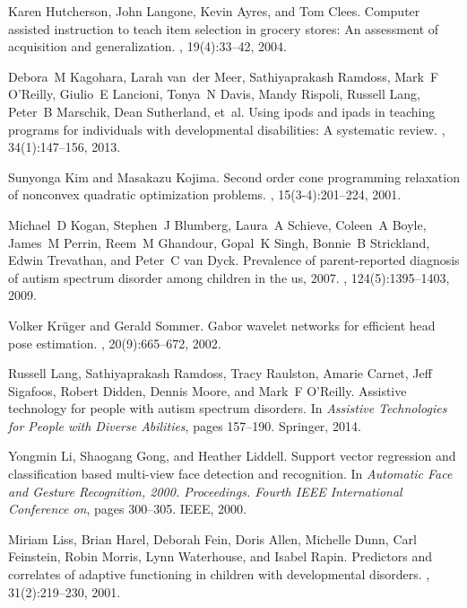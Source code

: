 \documentclass{ut-thesis}
\begin{document}
\begin{thebibliography}{100}
Karen Hutcherson, John Langone, Kevin Ayres, and Tom Clees.
\newblock Computer assisted instruction to teach item selection in grocery
  stores: An assessment of acquisition and generalization.
, 19(4):33--42, 2004.

Debora~M Kagohara, Larah van~der Meer, Sathiyaprakash Ramdoss, Mark~F
  O’Reilly, Giulio~E Lancioni, Tonya~N Davis, Mandy Rispoli, Russell Lang,
  Peter~B Marschik, Dean Sutherland, et~al.
\newblock Using ipods{\textregistered} and ipads{\textregistered} in teaching
  programs for individuals with developmental disabilities: A systematic
  review.
, 34(1):147--156, 2013.

Sunyonga Kim and Masakazu Kojima.
\newblock Second order cone programming relaxation of nonconvex quadratic
  optimization problems.
, 15(3-4):201--224, 2001.

Michael~D Kogan, Stephen~J Blumberg, Laura~A Schieve, Coleen~A Boyle, James~M
  Perrin, Reem~M Ghandour, Gopal~K Singh, Bonnie~B Strickland, Edwin Trevathan,
  and Peter~C van Dyck.
\newblock Prevalence of parent-reported diagnosis of autism spectrum disorder
  among children in the us, 2007.
, 124(5):1395--1403, 2009.

Volker Kr{\"u}ger and Gerald Sommer.
\newblock Gabor wavelet networks for efficient head pose estimation.
, 20(9):665--672, 2002.

Russell Lang, Sathiyaprakash Ramdoss, Tracy Raulston, Amarie Carnet, Jeff
  Sigafoos, Robert Didden, Dennis Moore, and Mark~F O’Reilly.
\newblock Assistive technology for people with autism spectrum disorders.
\newblock In {\em Assistive Technologies for People with Diverse Abilities},
  pages 157--190. Springer, 2014.

Yongmin Li, Shaogang Gong, and Heather Liddell.
\newblock Support vector regression and classification based multi-view face
  detection and recognition.
\newblock In {\em Automatic Face and Gesture Recognition, 2000. Proceedings.
  Fourth IEEE International Conference on}, pages 300--305. IEEE, 2000.

Miriam Liss, Brian Harel, Deborah Fein, Doris Allen, Michelle Dunn, Carl
  Feinstein, Robin Morris, Lynn Waterhouse, and Isabel Rapin.
\newblock Predictors and correlates of adaptive functioning in children with
  developmental disorders.
, 31(2):219--230,
  2001.


\end{thebibliography}
\end{document}
